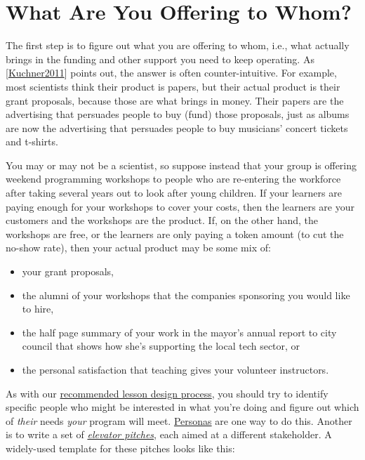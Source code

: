 \documentclass[10pt,statementpaper]{memoir}
\providecommand{\tightlist}{%
  \setlength{\itemsep}{0pt}\setlength{\parskip}{0pt}}
\begin{document}
\section{What Are You Offering to
Whom?}\label{what-are-you-offering-to-whom}

The first step is to figure out what you are offering to whom, i.e.,
what actually brings in the funding and other support you need to keep
operating. As {[}\href{biblio.html\#kuchner-marketing}{Kuchner2011}{]}
points out, the answer is often counter-intuitive. For example, most
scientists think their product is papers, but their actual product is
their grant proposals, because those are what brings in money. Their
papers are the advertising that persuades people to buy (fund) those
proposals, just as albums are now the advertising that persuades people
to buy musicians' concert tickets and t-shirts.

You may or may not be a scientist, so suppose instead that your group is
offering weekend programming workshops to people who are re-entering the
workforce after taking several years out to look after young children.
If your learners are paying enough for your workshops to cover your
costs, then the learners are your customers and the workshops are the
product. If, on the other hand, the workshops are free, or the learners
are only paying a token amount (to cut the no-show rate), then your
actual product may be some mix of:

\begin{itemize}
\tightlist
\item
  your grant proposals,
\item
  the alumni of your workshops that the companies sponsoring you would
  like to hire,
\item
  the half page summary of your work in the mayor's annual report to
  city council that shows how she's supporting the local tech sector, or
\item
  the personal satisfaction that teaching gives your volunteer
  instructors.
\end{itemize}

As with our \href{design.html}{recommended lesson design process}, you
should try to identify specific people who might be interested in what
you're doing and figure out which of \emph{their} needs \emph{your}
program will meet. \href{lessons.html\#learner-personas}{Personas} are
one way to do this. Another is to write a set of
\emph{\href{gloss.html\#elevator-pitch}{elevator pitches}}, each aimed
at a different stakeholder. A widely-used template for these pitches
looks like this:
\end{document}
